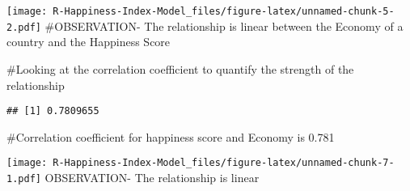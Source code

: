\documentclass[
]{article}
\newenvironment{Shaded}{\begin{snugshade}}{\end{snugshade}}
\newcommand{\FunctionTok}[1]{\textcolor[rgb]{0.00,0.00,0.00}{#1}}
\newcommand{\NormalTok}[1]{#1}
\newcommand{\SpecialCharTok}[1]{\textcolor[rgb]{0.00,0.00,0.00}{#1}}
\begin{document}
\begin{Shaded}
\end{Shaded}

\texttt{[image: R-Happiness-Index-Model\_files/figure-latex/unnamed-chunk-5-2.pdf]}
\#OBSERVATION- The relationship is linear between the Economy of a
country and the Happiness Score

\#Looking at the correlation coefficient to quantify the strength of the
relationship

\begin{Shaded}
\end{Shaded}

\begin{verbatim}
## [1] 0.7809655
\end{verbatim}

\#Correlation coefficient for happiness score and Economy is 0.781

\begin{Shaded}
\end{Shaded}

\texttt{[image: R-Happiness-Index-Model\_files/figure-latex/unnamed-chunk-7-1.pdf]}
OBSERVATION- The relationship is linear
\end{document}
